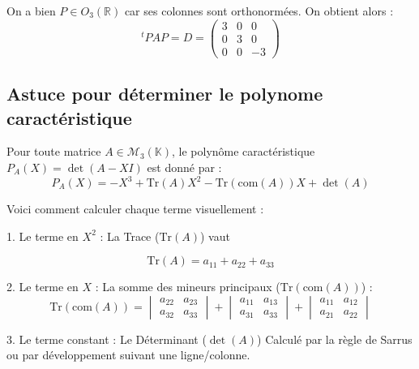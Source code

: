 \documentclass[french]{yLectureNote}
\begin{document}
On a bien $P \in O_3(\mathbb{R})$ car ses colonnes sont orthonormées. On obtient alors
 :
$$^tPAP = D = \begin{pmatrix} 3 & 0 & 0 \\ 0 & 3 & 0 \\ 0 & 0 & -3 \end{pmatrix}$$

\subsection{Astuce pour déterminer le polynome caractéristique}

\begin{theorem}
Pour toute matrice $A \in \mathcal{M}_3(\mathbb{K})$, le polynôme caractéristique $P_A(X) = \det(A - XI)$ est donné par :
$$P_A(X) = -X^3 + \text{Tr}(A)X^2 - \text{Tr}(\text{com}(A))X + \det(A)$$
\end{theorem}

Voici comment calculer chaque terme visuellement :

1.  Le terme en $X^2$ : La Trace ($\text{Tr}(A)$) vaut
    
    $$\text{Tr}(A) = a_{11} + a_{22} + a_{33}$$

2.  Le terme en $X$ : La somme des mineurs principaux ($\text{Tr}(\text{com}(A))$) :
    $$\text{Tr}(\text{com}(A)) = \begin{vmatrix} a_{22} & a_{23} \\ a_{32} & a_{33} \end{vmatrix} + \begin{vmatrix} a_{11} & a_{13} \\ a_{31} & a_{33} \end{vmatrix} + \begin{vmatrix} a_{11} & a_{12} \\ a_{21} & a_{22} \end{vmatrix}$$
    
3.  Le terme constant : Le Déterminant ($\det(A)$)
    Calculé par la règle de Sarrus ou par développement suivant une ligne/colonne.
\end{document}

